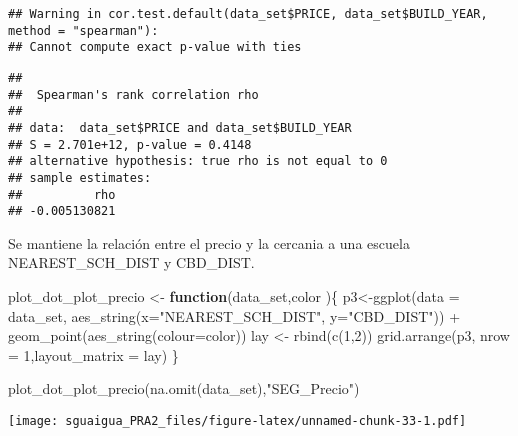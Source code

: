 \documentclass[
]{article}
\newenvironment{Shaded}{\begin{snugshade}}{\end{snugshade}}
\newcommand{\AttributeTok}[1]{\textcolor[rgb]{0.77,0.63,0.00}{#1}}
\newcommand{\ControlFlowTok}[1]{\textcolor[rgb]{0.13,0.29,0.53}{\textbf{#1}}}
\newcommand{\DecValTok}[1]{\textcolor[rgb]{0.00,0.00,0.81}{#1}}
\newcommand{\FunctionTok}[1]{\textcolor[rgb]{0.00,0.00,0.00}{#1}}
\newcommand{\NormalTok}[1]{#1}
\newcommand{\OtherTok}[1]{\textcolor[rgb]{0.56,0.35,0.01}{#1}}
\newcommand{\SpecialCharTok}[1]{\textcolor[rgb]{0.00,0.00,0.00}{#1}}
\newcommand{\StringTok}[1]{\textcolor[rgb]{0.31,0.60,0.02}{#1}}
\begin{document}
\begin{Shaded}
\end{Shaded}

\begin{verbatim}
## Warning in cor.test.default(data_set$PRICE, data_set$BUILD_YEAR, method = "spearman"):
## Cannot compute exact p-value with ties
\end{verbatim}

\begin{verbatim}
## 
##  Spearman's rank correlation rho
## 
## data:  data_set$PRICE and data_set$BUILD_YEAR
## S = 2.701e+12, p-value = 0.4148
## alternative hypothesis: true rho is not equal to 0
## sample estimates:
##          rho 
## -0.005130821
\end{verbatim}

Se mantiene la relación entre el precio y la cercania a una escuela
NEAREST\_SCH\_DIST y CBD\_DIST.

\begin{Shaded}
\begin{Highlighting}[]
\NormalTok{  plot\_dot\_plot\_precio }\OtherTok{\textless{}{-}} \ControlFlowTok{function}\NormalTok{(data\_set,color )\{}
\NormalTok{  p3}\OtherTok{\textless{}{-}}\FunctionTok{ggplot}\NormalTok{(}\AttributeTok{data =}\NormalTok{ data\_set, }\FunctionTok{aes\_string}\NormalTok{(}\AttributeTok{x=}\StringTok{"NEAREST\_SCH\_DIST"}\NormalTok{, }\AttributeTok{y=}\StringTok{"CBD\_DIST"}\NormalTok{)) }\SpecialCharTok{+}
             \FunctionTok{geom\_point}\NormalTok{(}\FunctionTok{aes\_string}\NormalTok{(}\AttributeTok{colour=}\NormalTok{color))}
\NormalTok{  lay }\OtherTok{\textless{}{-}} \FunctionTok{rbind}\NormalTok{(}\FunctionTok{c}\NormalTok{(}\DecValTok{1}\NormalTok{,}\DecValTok{2}\NormalTok{))}
  \FunctionTok{grid.arrange}\NormalTok{(p3, }\AttributeTok{nrow =} \DecValTok{1}\NormalTok{,}\AttributeTok{layout\_matrix =}\NormalTok{ lay)}
\NormalTok{\}}

\FunctionTok{plot\_dot\_plot\_precio}\NormalTok{(}\FunctionTok{na.omit}\NormalTok{(data\_set),}\StringTok{"SEG\_Precio"}\NormalTok{)}
\end{Highlighting}
\end{Shaded}

\texttt{[image: sguaigua\_PRA2\_files/figure-latex/unnamed-chunk-33-1.pdf]}
\end{document}
